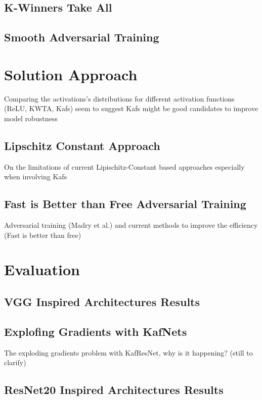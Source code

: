 \documentclass[LaM,binding=0.6cm]{./packages/sapthesis/sapthesis}
\begin{document}
    \section{K-Winners Take All}
    \section{Smooth Adversarial Training}


\chapter{Solution Approach}
 
    Comparing the activations's distributions for different activation functions (ReLU, KWTA, Kafs) 
    seem to suggest Kafs might be good candidates to improve model robustness 

    \section{Lipschitz Constant Approach}

        On the limitations of current Lipischitz-Constant based approaches especially when involving Kafs

    \section{Fast is Better than Free Adversarial Training}

        Adversarial training (Madry et al.) and current methods to improve the efficiency (Fast is better than free)


\chapter{Evaluation}

    \section{VGG Inspired Architectures Results}

    \section{Explofing Gradients with KafNets}

        The exploding gradients problem with KafResNet, why is it happening? (still to clarify)

    \section{ResNet20 Inspired Architectures Results}
\end{document}
